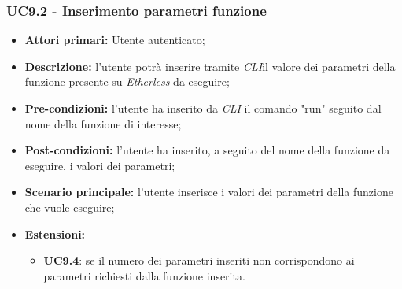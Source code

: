 \subsubsection{UC9.2 - Inserimento parametri funzione}
\begin{itemize}
	\item \textbf{Attori primari:} Utente autenticato;
	\item \textbf{Descrizione:} l'utente potrà inserire tramite \textit{CLI\glos}il valore dei parametri della funzione presente su \textit{Etherless} da eseguire; 
	\item \textbf{Pre-condizioni:} l'utente ha inserito da \textit{CLI\glo} il comando "run" seguito dal nome della funzione di interesse;
	\item \textbf{Post-condizioni:} l'utente ha inserito, a seguito del nome della funzione da eseguire, i valori dei parametri;
	\item \textbf{Scenario principale:} l'utente inserisce i valori dei parametri della funzione che vuole eseguire;
	\item \textbf{Estensioni:} 
	\begin{itemize}
		\item \textbf{UC9.4}: se il numero dei parametri inseriti non corrispondono ai parametri richiesti dalla funzione inserita.
	\end{itemize}
\end{itemize}